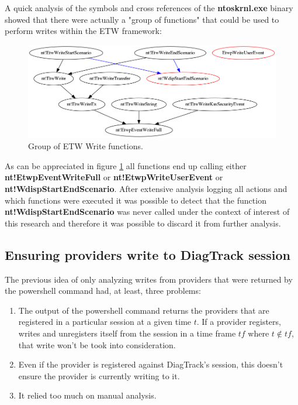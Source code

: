 A quick analysis of the symbols and cross references of the {\bfseries ntoskrnl.exe} binary showed that there were actually a "group of functions" that could be used to perform writes within the ETW framework:

\begin{centering}
  \begin{figure}[H]
    \includegraphics[width=15cm]{images/write_functions.png}
    \caption[]{Group of ETW Write functions.}
    \label{fig:etw_write_group_functions}
  \end{figure}
\end{centering}

As can be appreciated in figure \ref{fig:etw_write_group_functions} all functions end up calling  either {\bfseries nt!EtwpEventWriteFull} or {\bfseries nt!EtwpWriteUserEvent} or {\bfseries nt!WdispStartEndScenario}. After extensive analysis logging all actions and which functions were executed it was possible to detect that the function {\bfseries nt!WdispStartEndScenario} was never called under the context of interest of this research and therefore it was possible to discard it from further analysis. 


\subsection{\bfseries{Ensuring providers write to DiagTrack session}}
The previous idea of only analyzing writes from providers that were returned by the powershell command had, at least, three problems:

\begin{enumerate}
\setlength\itemsep{0.05em}
  \item The output of the powershell command returns the providers that are registered in a particular session at a given time $t$. If a provider registers, writes and unregisters itself from the session in a time frame $tf$ where $t \not\in tf$, that write won't be took into consideration.
  \item Even if the provider is registered against DiagTrack's session, this doesn't ensure the provider is currently writing to it.
  \item It relied too much on manual analysis.
\end{enumerate}

